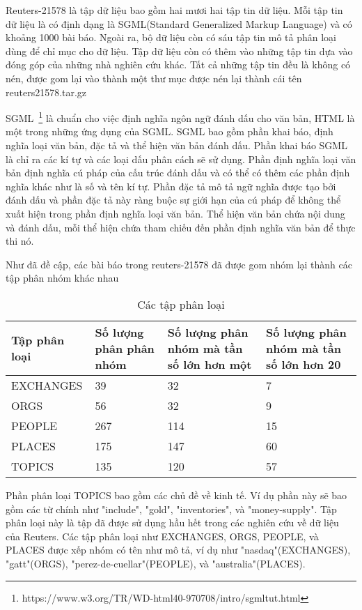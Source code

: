 Reuters-21578 là tập dữ liệu bao gồm hai mươi hai tập tin dữ liệu.
Mỗi tập tin dữ liệu là có định dạng là SGML(Standard Generalized Markup Language) và có khoảng 1000 bài báo.
Ngoài ra, bộ dữ liệu còn có sáu tập tin mô tả phân loại dùng để chỉ mục cho dữ liệu.
Tập dữ liệu còn có thêm vào những tập tin dựa vào đóng góp của những nhà nghiên cứu khác.
Tất cả những tập tin đều là không có nén, được gom lại vào thành một thư mục được nén lại thành cái tên reuters21578.tar.gz

SGML~\footnote{https://www.w3.org/TR/WD-html40-970708/intro/sgmltut.html} là chuẩn cho việc định nghĩa ngôn ngữ đánh dấu cho văn bản, HTML là một trong những ứng dụng của SGML.
SGML bao gồm phần khai báo, định nghĩa loại văn bản, đặc tả và thể hiện văn bản đánh dấu.
Phần khai báo SGML là chỉ ra các kí tự và các loại dấu phân cách sẽ sử dụng.
Phần định nghĩa loại văn bản định nghĩa cú pháp của cấu trúc đánh dấu và có thể có thêm các phần định nghĩa khác như là số và tên kí tự.
Phần đặc tả mô tả ngữ nghĩa được tạo bởi đánh dấu và phần đặc tả này ràng buộc sự giới hạn của cú pháp để không thể xuất hiện trong phần định nghĩa loại văn bản.
Thể hiện văn bản chứa nội dung và đánh dấu, mỗi thể hiện chứa tham chiếu đến phần định nghĩa văn bản để thực thi nó.

Như đã đề cập, các bài báo trong reuters-21578 đã được gom nhóm lại thành các tập phân nhóm khác nhau
\begin{table}[ht]
\begin{center}
\begin{tabularx}{\textwidth}{|Y|Y|Y|Y|}
\hline
Tập phân loại & Số lượng phân phân nhóm & Số lượng phân nhóm mà tần số lớn hơn một & Số lượng phân nhóm mà tần số lớn hơn 20  \\
\hline
EXCHANGES & 39 & 32 & 7\\
\hline
ORGS & 56 & 32 & 9\\
\hline
PEOPLE & 267 & 114 & 15 \\
\hline
PLACES & 175 & 147 & 60\\
\hline
TOPICS & 135 & 120 & 57\\
\hline
\end{tabularx}
\caption[Các tập phân loại]{Các tập phân loại}
\label{bang_4_2}
\end{center}
\end{table}

Phần phân loại TOPICS bao gồm các chủ đề về kinh tế.
Ví dụ phần này sẽ bao gồm các từ chính như "include", "gold", "inventories", và "money-supply".
Tập phân loại này là tập đã được sử dụng hầu hết trong các nghiên cứu về dữ liệu của Reuters.
Các tập phân loại như EXCHANGES, ORGS, PEOPLE, và PLACES được xếp nhóm có tên như mô tả, ví dụ như "nasdaq"(EXCHANGES), "gatt"(ORGS), "perez-de-cuellar"(PEOPLE), và "australia"(PLACES).

